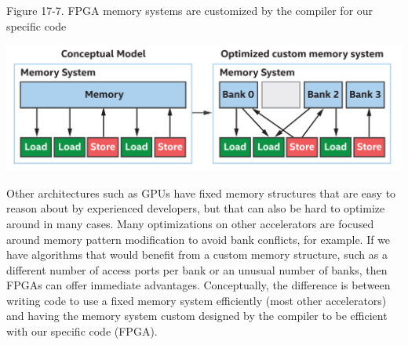 \hspace*{\fill} \par %
Figure 17-7. FPGA memory systems are customized by the compiler for our specific code
\begin{center}
	\includegraphics[width=1.0\textwidth]{content/chapter-17/images/8}
\end{center}

Other architectures such as GPUs have fixed memory structures that are easy to reason about by experienced developers, but that can also be hard to optimize around in many cases. Many optimizations on other accelerators are focused around memory pattern modification to avoid bank conflicts, for example. If we have algorithms that would benefit from a custom memory structure, such as a different number of access ports per bank or an unusual number of banks, then FPGAs can offer immediate advantages. Conceptually, the difference is between writing code to use a fixed memory system efficiently (most other accelerators) and having the memory system custom designed by the compiler to be efficient with our specific code (FPGA).\par



























